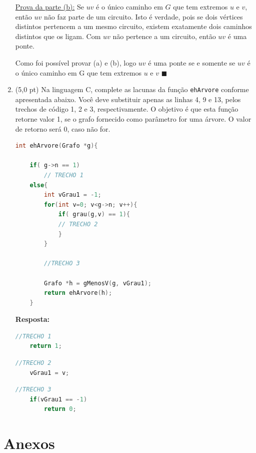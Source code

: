 \documentclass[12pt,a4paper,oneside]{article}
\begin{document}
\begin{enumerate}
{	\underline{Prova da parte (b):} Se $uv$ é o único caminho em $G$ que tem extremos $u$ e $v$, então $uv$ não faz parte de um circuito. Isto é verdade, pois se dois vértices distintos pertencem a um mesmo circuito, existem exatamente dois caminhos distintos que os ligam. Com $uv$ não pertence a um circuito, então $uv$ é uma ponte.
	
	Como foi possível provar (a) e (b), logo $uv$ é uma ponte se e somente se $uv$ é o único caminho em G que tem extremos $u$ e $v$ $\blacksquare$
		
	}

	\newpage
	
	\item (5,0 pt) Na linguagem C, complete as lacunas da função {\tt ehArvore} conforme apresentada abaixo. Você deve substituir apenas as linhas 4, 9 e 13, pelos trechos de código 1, 2 e 3, respectivamente. O objetivo é que esta função retorne valor 1, se o grafo fornecido como parâmetro for uma árvore. O valor de retorno será 0, caso não for.
	
	\begin{lstlisting}[language=C]
	int ehArvore(Grafo *g){
	
	if( g->n == 1)
		// TRECHO 1
	else{
		int vGrau1 = -1;
		for(int v=0; v<g->n; v++){
			if( grau(g,v) == 1){
			// TRECHO 2
			}
		}
	
		//TRECHO 3
		
		Grafo *h = gMenosV(g, vGrau1);
		return ehArvore(h);
	}\end{lstlisting}
	
	
	
	{\color{blue} \bf Resposta: } \\
	\begin{lstlisting}[language=C]
	//TRECHO 1
	return 1;
	\end{lstlisting}
	
	\begin{lstlisting}[language=C]
	//TRECHO 2
	vGrau1 = v;
	\end{lstlisting}
	
	\begin{lstlisting}[language=C]
	//TRECHO 3
	if(vGrau1 == -1)
		return 0;
	\end{lstlisting}
	
	\end{enumerate}

	\newpage
	\section*{Anexos}
\end{document}
